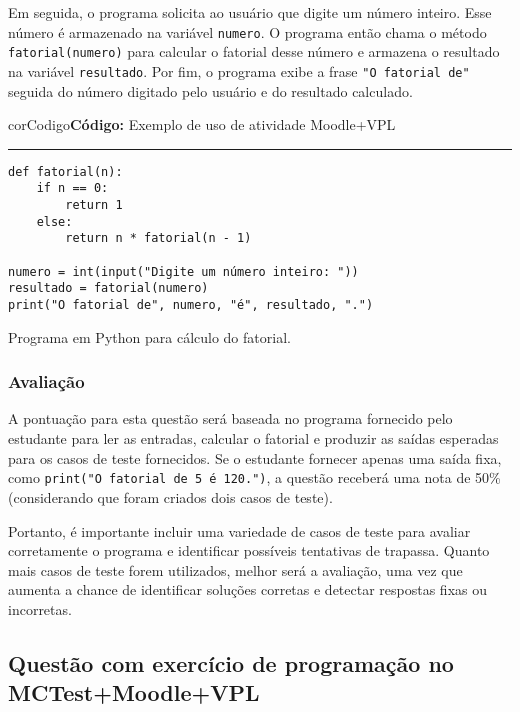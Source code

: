 Em seguida, o programa solicita ao usuário que digite um número inteiro. Esse número é armazenado na variável \verb|numero|. O programa então chama o método \verb|fatorial(numero)| para calcular o fatorial desse número e armazena o resultado na variável \verb|resultado|. Por fim, o programa exibe a frase \verb|"O fatorial de"| seguida do número digitado pelo usuário e do resultado calculado.

\begin{listing}[!ht]
\begin{myboxCode}{corCodigo}{\textbf{Código: } Exemplo de uso de atividade Moodle+VPL}\vspace{3mm}
\hrule
\begin{verbatim}
def fatorial(n):
    if n == 0:
        return 1
    else:
        return n * fatorial(n - 1)

numero = int(input("Digite um número inteiro: "))
resultado = fatorial(numero)
print("O fatorial de", numero, "é", resultado, ".")
\end{verbatim}
\end{myboxCode}
\caption{Programa em Python para cálculo do fatorial.}
\label{lst:fatorial}
\end{listing}


\subsubsection{Avaliação}

A pontuação para esta questão será baseada no programa fornecido pelo estudante para ler as entradas, calcular o fatorial e produzir as saídas esperadas para os casos de teste fornecidos. Se o estudante fornecer apenas uma saída fixa, como \verb|print("O fatorial de 5 é 120.")|, a questão receberá uma nota de 50\% (considerando que foram criados dois casos de teste).

Portanto, é importante incluir uma variedade de casos de teste para avaliar corretamente o programa e identificar possíveis tentativas de trapassa. Quanto mais casos de teste forem utilizados, melhor será a avaliação, uma vez que aumenta a chance de identificar soluções corretas e detectar respostas fixas ou incorretas.


\subsection{Questão com exercício de programação no MCTest+Moodle+VPL}\label{sec:questao_VPL}

